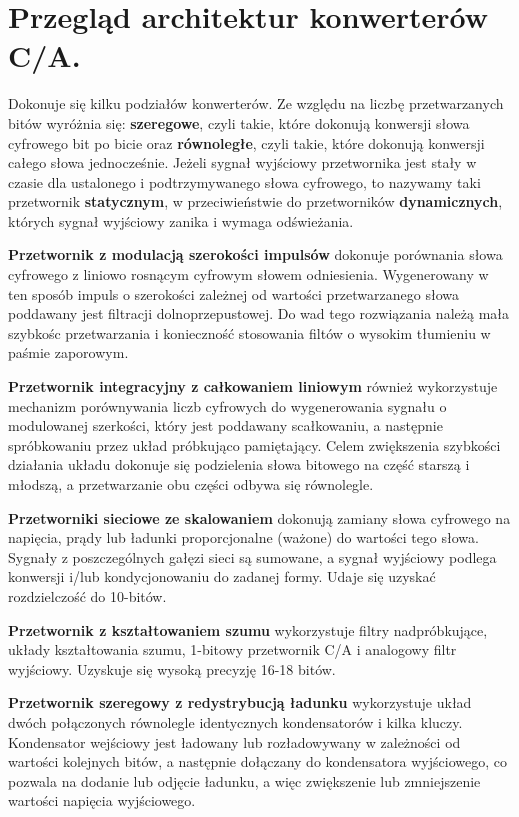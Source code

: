\documentclass[10pt,a4paper]{report}
\theoremstyle{definition}
\theoremstyle{definition}
\theoremstyle{definition}
\theoremstyle{definition}
\theoremstyle{definition}
\begin{document}
	
	\section{Przegląd architektur konwerterów C/A. \cite{cmosanal} \cite{plassche}}
	{	Dokonuje się kilku podziałów konwerterów. Ze względu na liczbę przetwarzanych bitów wyróżnia się: \textbf{szeregowe}, czyli takie, które dokonują konwersji słowa cyfrowego bit po bicie oraz \textbf{równoległe}, czyli takie, które dokonują konwersji całego słowa jednocześnie. Jeżeli sygnał wyjściowy przetwornika jest stały w czasie dla ustalonego i podtrzymywanego słowa cyfrowego, to nazywamy taki przetwornik \textbf{statycznym}, w przeciwieństwie do przetworników \textbf{dynamicznych}, których sygnał wyjściowy zanika i wymaga odświeżania. }
	
	{	\textbf{Przetwornik z modulacją szerokości impulsów} dokonuje porównania słowa cyfrowego z liniowo rosnącym cyfrowym słowem odniesienia. Wygenerowany w ten sposób impuls o szerokości zależnej od wartości przetwarzanego słowa poddawany jest filtracji dolnoprzepustowej. Do wad tego rozwiązania należą mała szybkośc przetwarzania i konieczność stosowania filtów o wysokim tłumieniu w paśmie zaporowym. }
	
	{	\textbf{Przetwornik integracyjny z całkowaniem liniowym} również wykorzystuje mechanizm porównywania liczb cyfrowych do wygenerowania sygnału o modulowanej szerkości, który jest poddawany scałkowaniu, a następnie spróbkowaniu przez układ próbkująco pamiętający. Celem zwiększenia szybkości działania układu dokonuje się podzielenia słowa bitowego na część starszą i młodszą, a przetwarzanie obu części odbywa się równolegle. }
	
	{	\textbf{Przetworniki sieciowe ze skalowaniem} dokonują zamiany słowa cyfrowego na napięcia, prądy lub ładunki proporcjonalne (ważone) do wartości tego słowa. Sygnały z poszczególnych gałęzi sieci są sumowane, a sygnał wyjściowy podlega konwersji i/lub kondycjonowaniu do zadanej formy. Udaje się uzyskać rozdzielczość do 10-bitów.}
	
	{	\textbf{Przetwornik z kształtowaniem szumu} wykorzystuje filtry nadpróbkujące, układy kształtowania szumu, 1-bitowy przetwornik C/A i analogowy filtr wyjściowy. Uzyskuje się wysoką precyzję 16-18 bitów. }
	
	{	\textbf{Przetwornik szeregowy z redystrybucją ładunku} wykorzystuje układ dwóch połączonych równolegle identycznych kondensatorów i kilka kluczy. Kondensator wejściowy jest ładowany lub rozładowywany w zależności od wartości kolejnych bitów, a następnie dołączany do kondensatora wyjściowego, co pozwala na dodanie lub odjęcie ładunku, a więc zwiększenie lub zmniejszenie wartości napięcia wyjściowego.
	}
	
\end{document}
